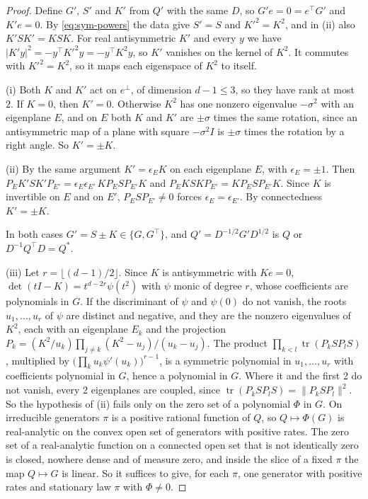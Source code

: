 \begin{proof}
Define $G'$, $S'$ and $K'$ from $Q'$ with the same $D$, so $G'e=0=e^\top G'$ and $K'e=0$. By
\eqref{eq:sym-powers} the data give $S'=S$ and $K'^2=K^2$, and in (ii) also $K'SK'=KSK$. For real
antisymmetric $K'$ and every $y$ we have $|K'y|^2=-y^\top K'^2y=-y^\top K^2y$, so $K'$ vanishes on
the kernel of $K^2$. It commutes with $K'^2=K^2$, so it maps each eigenspace of $K^2$ to itself.

(i) Both $K$ and $K'$ act on $e^\perp$, of dimension $d-1\le3$, so they have rank at most $2$. If
$K=0$, then $K'=0$. Otherwise $K^2$ has one nonzero eigenvalue $-\sigma^2$ with an eigenplane $E$,
and on $E$ both $K$ and $K'$ are $\pm\sigma$ times the same rotation, since an
antisymmetric map of a plane with square $-\sigma^2I$ is $\pm\sigma$ times the rotation by a right
angle. So $K'=\pm K$.

(ii) By the same argument $K'=\epsilon_EK$ on each eigenplane $E$, with $\epsilon_E=\pm1$. Then
$P_EK'SK'P_{E'}=\epsilon_E\epsilon_{E'}\,KP_ESP_{E'}K$ and $P_EKSKP_{E'}=KP_ESP_{E'}K$. Since $K$ is
invertible on $E$ and on $E'$, $P_ESP_{E'}\ne0$ forces $\epsilon_E=\epsilon_{E'}$. By connectedness
$K'=\pm K$.

In both cases $G'=S\pm K\in\{G,G^\top\}$, and $Q'=D^{-1/2}G'D^{1/2}$ is $Q$ or
$D^{-1}Q^\top D=Q^*$.

(iii) Let $r=\lfloor(d-1)/2\rfloor$. Since $K$ is antisymmetric with $Ke=0$,
$\det(tI-K)=t^{d-2r}\psi(t^2)$ with $\psi$ monic of degree $r$, whose coefficients are polynomials
in $G$. If the discriminant of $\psi$ and $\psi(0)$ do not vanish, the roots $u_1,\dots,u_r$ of
$\psi$ are distinct and negative, and they are the nonzero eigenvalues of $K^2$, each with an
eigenplane $E_k$ and the projection
$P_k=(K^2/u_k)\prod_{j\ne k}(K^2-u_j)/(u_k-u_j)$. The product
$\prod_{k<l}\operatorname{tr}(P_kSP_lS)$, multiplied by $\bigl(\prod_ku_k\psi'(u_k)\bigr)^{r-1}$, is
a symmetric polynomial in $u_1,\dots,u_r$ with coefficients polynomial in $G$, hence a polynomial
in $G$. Where it and the first 2 do not vanish, every 2 eigenplanes are coupled, since
$\operatorname{tr}(P_kSP_lS)=\|P_kSP_l\|^2$. So the hypothesis of (ii) fails only on the zero set
of a polynomial $\Phi$ in $G$. On irreducible generators $\pi$ is a positive rational function
of $Q$, so $Q\mapsto\Phi(G)$ is real-analytic on the convex open set of generators with positive
rates. The zero set of a real-analytic function on a connected open set that is not identically
zero is closed, nowhere dense and of measure zero, and inside the slice of a fixed $\pi$ the map
$Q\mapsto G$ is linear. So it suffices to give, for each $\pi$, one generator with positive rates
and stationary law $\pi$ with $\Phi\ne0$.


\end{proof}
